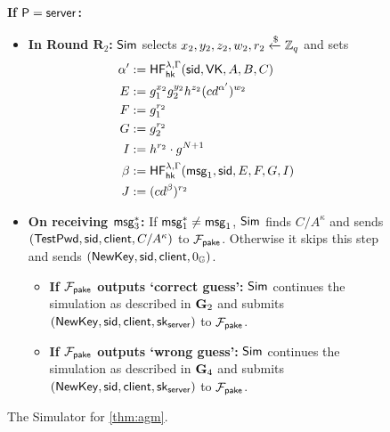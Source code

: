 \begin{figure}[tbp]
\begin{framed}
	\textbf{If $\mathsf{P}=\mathsf{server}$:}
		\begin{itemize}
			\item \textbf{In Round $\mathbf{R}_2$:} $\mathsf{Sim}$ selects $x_2,y_2,z_2,w_2,r_2\xleftarrow{\$}\mathbb{Z}_q$ and sets
			\begin{align*}
				\alpha' &:= \mathsf{HF}_{\mathsf{hk}}^{\lambda,\Gamma}(\mathsf{sid},\mathsf{VK},A,B,C)\\
				E &:= g_1^{x_2}g_2^{y_2}h^{z_2}(cd^{\alpha'})^{w_2}\\
				F &:= g_1^{r_2}\\
				G &:= g_2^{r_2}\\
				I &:= h^{r_2}\cdot g^{N+1}\\
				\beta &:= \mathsf{HF}_{\mathsf{hk}}^{\lambda,\Gamma}(\mathsf{msg}_{1},\mathsf{sid},E,F,G,I)\\
				J &:= (cd^{\beta})^{r_2}
			\end{align*}
		\item \textbf{On receiving $\mathsf{msg}_{3}^{*}$:} If $\mathsf{msg}_{1}^{*}\neq\mathsf{msg}_{1}$, $\mathsf{Sim}$ finds $C/A^\kappa$ and sends $(\mathsf{TestPwd},\mathsf{sid},\mathsf{client},C/A^\kappa)$ to $\mathcal{F}_{\mathsf{pake}}$. Otherwise it skips this step and sends $(\mathsf{NewKey},\mathsf{sid},\mathsf{client},0_{\mathbb{G}})$. 
		\begin{itemize}
			\item \textbf{If $\mathcal{F}_{\mathsf{pake}}$ outputs `correct guess':} $\mathsf{Sim}$ continues the simulation as described in $\mathbf{G}_2$ and submits $(\mathsf{NewKey},\mathsf{sid}, \mathsf{client},\mathsf{sk}_{\mathsf{server}})$ to $\mathcal{F}_{\mathsf{pake}}$.
			\item \textbf{If $\mathcal{F}_{\mathsf{pake}}$ outputs `wrong guess':} $\mathsf{Sim}$ continues the simulation as described in $\mathbf{G}_4$ and submits $(\mathsf{NewKey},\mathsf{sid}, \mathsf{client},\mathsf{sk}_{\mathsf{server}})$ to $\mathcal{F}_{\mathsf{pake}}$.
		\end{itemize}
		\end{itemize}

	\end{framed}
	\caption{The Simulator for \cref{thm:agm}.}
	\label{fig:agm-sim}
\end{figure}
